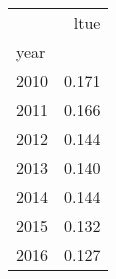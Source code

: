 \begin{tabular}{lr}
\toprule
{} &  ltue \\
year &       \\
\midrule
2010 & 0.171 \\
2011 & 0.166 \\
2012 & 0.144 \\
2013 & 0.140 \\
2014 & 0.144 \\
2015 & 0.132 \\
2016 & 0.127 \\
\bottomrule
\end{tabular}
